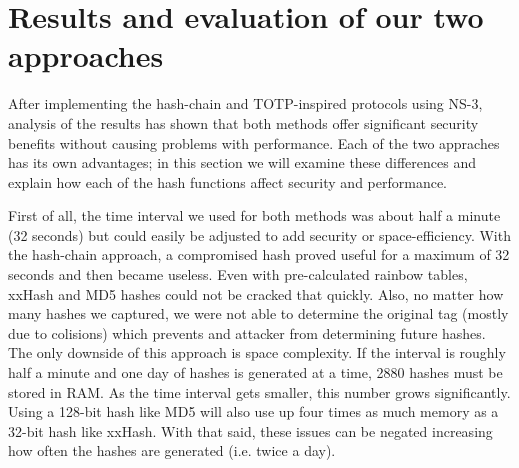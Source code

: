 \documentclass[12pt]{article} %
\begin{document}

\newpage %



\section{Results and evaluation of our two approaches}

After implementing the hash-chain and TOTP-inspired protocols using NS-3, analysis of the results has shown that both methods offer significant security benefits without causing problems with performance. Each of the two appraches has its own advantages; in this section we will examine these differences and explain how each of the hash functions affect security and performance.

First of all, the time interval we used for both methods was about half a minute (32 seconds) but could easily be adjusted to add security or space-efficiency. With the hash-chain approach, a compromised hash proved useful for a maximum of 32 seconds and then became useless. Even with pre-calculated rainbow tables, xxHash and MD5 hashes could not be cracked that quickly. Also, no matter how many hashes we captured, we were not able to determine the original tag (mostly due to colisions) which prevents and attacker from determining future hashes. The only downside of this approach is space complexity. If the interval is roughly half a minute and one day of hashes is generated at a time, 2880 hashes must be stored in RAM. As the time interval gets smaller, this number grows significantly. Using a 128-bit hash like MD5 will also use up four times as much memory as a 32-bit hash like xxHash. With that said, these issues can be negated increasing how often the hashes are generated (i.e. twice a day).
\end{document}
